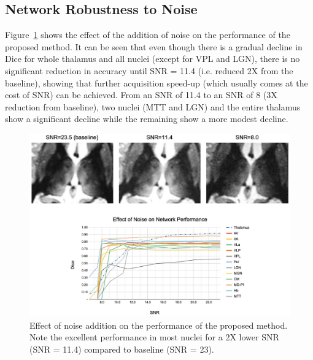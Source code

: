 \documentclass[3p,,final,12pt]{elsarticle}
\begin{document}
\subsection{Network Robustness to Noise}Figure~\ref{f-136457b1c04a}  shows the effect of the addition of noise on the performance of the proposed method. It can be seen that even though there is a gradual decline in Dice for whole thalamus and all nuclei (except for VPL and LGN), there is no significant reduction in accuracy until SNR = 11.4 (i.e. reduced {\texttildeapprox} 2X from the baseline), showing that further acquisition speed-up (which usually comes at the cost of SNR) can be achieved. From an SNR of 11.4 to an SNR of 8 ({\texttildeapprox}3X reduction from baseline), two nuclei (MTT and LGN) and the entire thalamus show a significant decline while the remaining show a more modest decline.
\bgroup
{}
\begin{figure}[!htbp]
\centering \includegraphics{Thalamus/images/slide6.jpeg}
\makeatother 
\caption{Effect of noise addition on the performance of the proposed method. Note the excellent performance in most nuclei for a 2X lower SNR (SNR = 11.4) compared to baseline (SNR = 23).}
\label{f-136457b1c04a}
\end{figure}
\egroup
\end{document}
